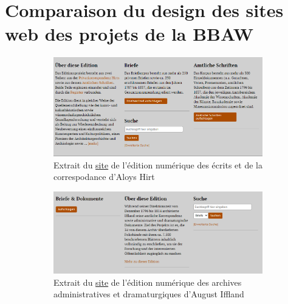 \documentclass[a4paper, 12pt, twoside]{book}
\begin{document}
\chapter{Comparaison du design des sites web des projets de la BBAW}
\label{annexe:designBBAW}
\begin{figure}
    \centering
    
    \begin{subfigure}[b]{0.7\textwidth}
        \centering
        \includegraphics[width=1\linewidth]{img/aloys_websitepresentation.png}
        \caption{Extrait du \href{https://aloys-hirt.bbaw.de/}{site} de l'édition numérique des écrits et de la correspodance d'Aloys Hirt}
    \end{subfigure}
        \begin{subfigure}[b]{0.7\textwidth}
        \centering
        \includegraphics[width=1\linewidth]{img/iffland_websitepresentation.png}
        \caption{Extrait du \href{https://iffland.bbaw.de/}{site} de l'édition numérique des archives administratives et dramaturgiques d'August Iffland}
    \end{subfigure}
    \begin{subfigure}[b]{0.7\textwidth}
        \centering

\end{subfigure}
\end{figure}
\end{document}
